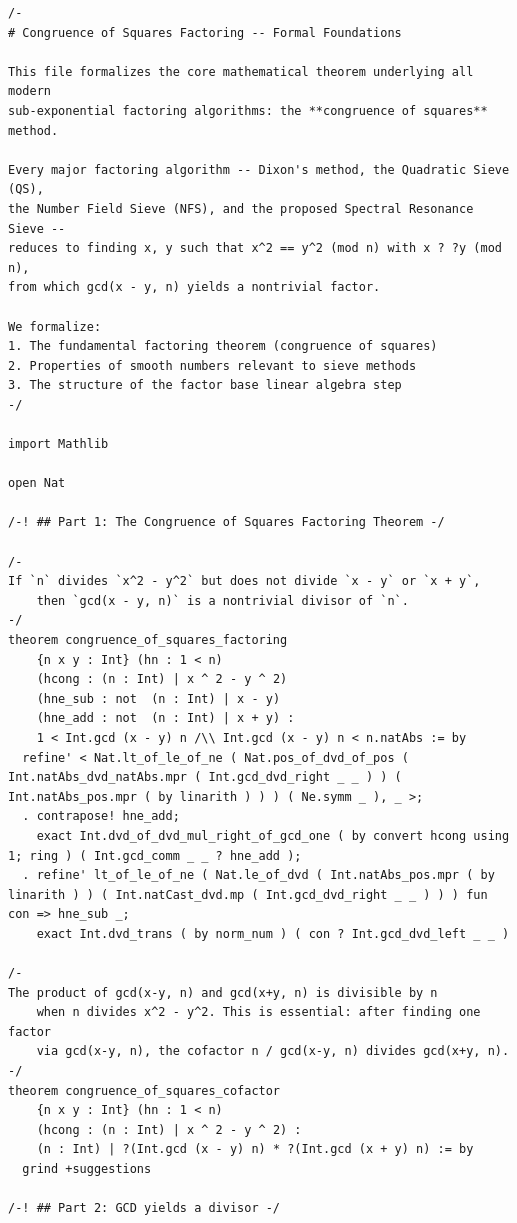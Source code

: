 \documentclass[11pt,openright,twoside]{book}
\theoremstyle{definition}
\begin{document}
\begin{lstlisting}[style=lean]
/-
# Congruence of Squares Factoring -- Formal Foundations

This file formalizes the core mathematical theorem underlying all modern
sub-exponential factoring algorithms: the **congruence of squares** method.

Every major factoring algorithm -- Dixon's method, the Quadratic Sieve (QS),
the Number Field Sieve (NFS), and the proposed Spectral Resonance Sieve --
reduces to finding x, y such that x^2 == y^2 (mod n) with x ? ?y (mod n),
from which gcd(x - y, n) yields a nontrivial factor.

We formalize:
1. The fundamental factoring theorem (congruence of squares)
2. Properties of smooth numbers relevant to sieve methods
3. The structure of the factor base linear algebra step
-/

import Mathlib

open Nat

/-! ## Part 1: The Congruence of Squares Factoring Theorem -/

/-
If `n` divides `x^2 - y^2` but does not divide `x - y` or `x + y`,
    then `gcd(x - y, n)` is a nontrivial divisor of `n`.
-/
theorem congruence_of_squares_factoring
    {n x y : Int} (hn : 1 < n)
    (hcong : (n : Int) | x ^ 2 - y ^ 2)
    (hne_sub : not  (n : Int) | x - y)
    (hne_add : not  (n : Int) | x + y) :
    1 < Int.gcd (x - y) n /\\ Int.gcd (x - y) n < n.natAbs := by
  refine' < Nat.lt_of_le_of_ne ( Nat.pos_of_dvd_of_pos ( Int.natAbs_dvd_natAbs.mpr ( Int.gcd_dvd_right _ _ ) ) ( Int.natAbs_pos.mpr ( by linarith ) ) ) ( Ne.symm _ ), _ >;
  . contrapose! hne_add;
    exact Int.dvd_of_dvd_mul_right_of_gcd_one ( by convert hcong using 1; ring ) ( Int.gcd_comm _ _ ? hne_add );
  . refine' lt_of_le_of_ne ( Nat.le_of_dvd ( Int.natAbs_pos.mpr ( by linarith ) ) ( Int.natCast_dvd.mp ( Int.gcd_dvd_right _ _ ) ) ) fun con => hne_sub _;
    exact Int.dvd_trans ( by norm_num ) ( con ? Int.gcd_dvd_left _ _ )

/-
The product of gcd(x-y, n) and gcd(x+y, n) is divisible by n
    when n divides x^2 - y^2. This is essential: after finding one factor
    via gcd(x-y, n), the cofactor n / gcd(x-y, n) divides gcd(x+y, n).
-/
theorem congruence_of_squares_cofactor
    {n x y : Int} (hn : 1 < n)
    (hcong : (n : Int) | x ^ 2 - y ^ 2) :
    (n : Int) | ?(Int.gcd (x - y) n) * ?(Int.gcd (x + y) n) := by
  grind +suggestions

/-! ## Part 2: GCD yields a divisor -/


\end{lstlisting}
\end{document}
